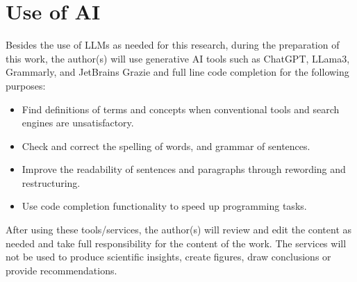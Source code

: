 \section{Use of AI}
\label{sec:use-of-ai}

Besides the use of LLMs as needed for this research, during the preparation of this work, the author(s) will use
generative AI tools such as ChatGPT, LLama3, Grammarly, and JetBrains Grazie and full line code completion for the
following purposes:

\begin{itemize}
    \item Find definitions of terms and concepts when conventional tools and search engines are unsatisfactory.
    \item Check and correct the spelling of words, and grammar of sentences.
    \item Improve the readability of sentences and paragraphs through rewording and restructuring.
    \item Use code completion functionality to speed up programming tasks.
\end{itemize}

After using these tools/services, the author(s) will review and edit the content as needed and take full
responsibility for the content of the work.
The services will not be used to produce scientific insights, create figures, draw conclusions or provide
recommendations.